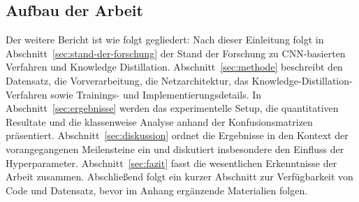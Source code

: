 \subsection{Aufbau der Arbeit}
\label{subsec:aufbau}

Der weitere Bericht ist wie folgt gegliedert:
Nach dieser Einleitung folgt in Abschnitt~\ref{sec:stand-der-forschung} der Stand der Forschung zu CNN-basierten Verfahren und Knowledge Distillation.
Abschnitt~\ref{sec:methode} beschreibt den Datensatz, die Vorverarbeitung, die Netzarchitektur, das Knowledge-Distillation-Verfahren sowie Trainings- und Implementierungsdetails.
In Abschnitt~\ref{sec:ergebnisse} werden das experimentelle Setup, die quantitativen Resultate und die klassenweise Analyse anhand der Konfusionsmatrizen präsentiert.
Abschnitt~\ref{sec:diskussion} ordnet die Ergebnisse in den Kontext der vorangegangenen Meilensteine ein und diskutiert insbesondere den Einfluss der Hyperparameter.
Abschnitt~\ref{sec:fazit} fasst die wesentlichen Erkenntnisse der Arbeit zusammen.
Abschließend folgt ein kurzer Abschnitt zur Verfügbarkeit von Code und Datensatz, bevor im Anhang ergänzende Materialien folgen.